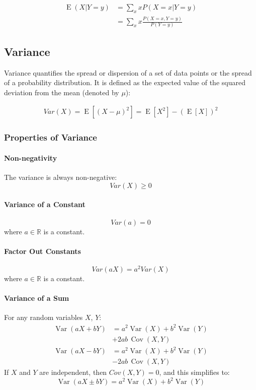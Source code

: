 \documentclass[8pt, a4paper, landscape, includeheadfoot]{extarticle}
\begin{document}
\begin{multicols*}{4}
	\begin{align*}
		\operatorname{E}(X | Y = y) & =  \sum_x x P(X = x | Y = y)                \\
		                            & = \sum_x x \frac{P(X = x, Y = y)}{P(Y = y)}
	\end{align*}

	\subsection{Variance}

	Variance quantifies the spread or dispersion of a set of data points or the spread of a probability distribution. It is defined as the expected value of the squared deviation from the mean (denoted by \(\mu\)):

	\begin{align*}
		Var(X) = \operatorname{E}[\left(X - \mu\right)^2] = \operatorname{E}[X^2] - (\operatorname{E}[X])^2
	\end{align*}

	\subsubsection{Properties of Variance}

	\paragraph{Non-negativity}
	The variance is always non-negative:
	$$
		Var(X) \geq 0
	$$

	\paragraph{Variance of a Constant}
	$$
		Var(a) = 0
	$$
	where \(a\in\mathbb{R}\) is a constant.

	\paragraph{Factor Out Constants}
	$$
		Var(aX) = a^2 Var(X)
	$$
	where \(a\in\mathbb{R}\) is a constant.

	\paragraph{Variance of a Sum}
	For any random variables \(X\), \(Y\):
	\begin{align*}
		\operatorname{Var}(aX + bY) & =a^2\operatorname{Var}(X)+b^2\operatorname{Var}(Y) \\
		                            & +2ab\, \operatorname{Cov}(X,Y)                     \\
		\operatorname{Var}(aX - bY) & =a^2\operatorname{Var}(X)+b^2\operatorname{Var}(Y) \\
		                            & -2ab\, \operatorname{Cov}(X,Y)
	\end{align*}
	If \(X\) and \(Y\) are independent, then \(Cov(X, Y) = 0\), and this simplifies to:
	$$
		\operatorname{Var}(aX \pm bY) =a^2\operatorname{Var}(X)+b^2\operatorname{Var}(Y)
	$$


\end{multicols*}
\end{document}
